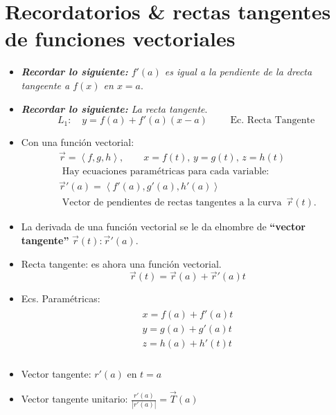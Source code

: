 \documentclass{article}
\begin{document}
\section{Recordatorios \& rectas tangentes de funciones vectoriales}
\begin{itemize}
    \item \emph{\textbf{Recordar lo siguiente: }$f'(a)$ es igual a la pendiente de la drecta tangeente a $f(x)$ en $x=a$}.
    \item \emph{\textbf{Recordar lo siguiente: }La recta tangente}.
        \[
          L_1: \quad y = f(a)+f'(a)(x-a) \quad \quad \text{  Ec. Recta Tangente  }
        \]
    
    \item Con una función vectorial:
        \begin{align*}
            \vec{r}= \left\langle f,g,h \right\rangle , \quad \quad x = f(t), \, y=g(t), \, z=h(t) \\ 
            \text{  Hay ecuaciones paramétricas para cada variable:  } \\ 
            \vec{r}'(a) = \left\langle f'(a),g'(a),h'(a) \right\rangle \\ 
            \text{  Vector de pendientes de rectas tangentes a la curva  } \, \vec{r}(t).
        \end{align*}
    
    \item La derivada de una función vectorial se le da elnombre de \textbf{``vector tangente''} $\vec{r}(t):\vec{r}'(a)$.
    \item Recta tangente: es ahora una función vectorial.
        \[
          \vec{r}(t) = \vec{r}(a) + \vec{r}'(a)t 
        \]
    
    \item Ecs. Paramétricas:
        \begin{align*}
            \begin{matrix}
                x=f(a)+f'(a)t \\ 
                y=g(a)+g'(a)t \\ 
                z=h(a)+h'(t)t \\ 
            \end{matrix}
        \end{align*}
    
    \item Vector tangente: $r'(a)$ en $t=a$
    \item Vector tangente unitario: $\frac{r'(a)}{\left| r'(a) \right| } = \vec{T}(a)$
\end{itemize}
\end{document}
